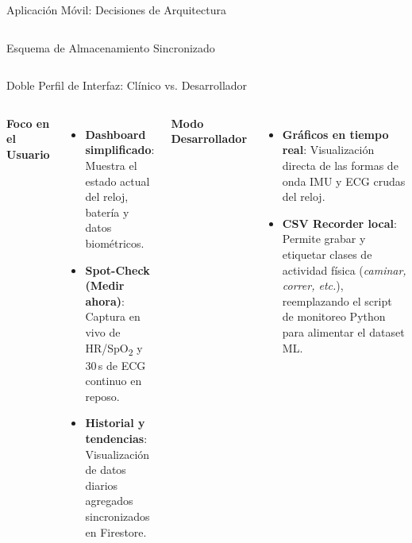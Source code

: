 \documentclass[aspectratio=169, 10pt]{beamer}
\begin{document}
\begin{frame}{Aplicaci\'on M\'ovil: Decisiones de Arquitectura}
\begin{columns}[T]
\begin{block}{Esquema de Almacenamiento Sincronizado}
        \end{block}
        \vspace{0.1cm}
    \end{columns}
\end{frame}

\begin{frame}{Doble Perfil de Interfaz: Cl\'inico vs. Desarrollador}
    \begin{columns}[T]
        \footnotesize
        \textbf{Foco en el Usuario}
        \begin{itemize}\itemsep0.1cm
            \item \textbf{Dashboard simplificado}: Muestra el estado actual del reloj, bater\'ia y datos biom\'etricos.
            \item \textbf{Spot-Check (Medir ahora)}: Captura en vivo de HR/SpO\textsubscript{2} y 30\,s de ECG continuo en reposo.
            \item \textbf{Historial y tendencias}: Visualizaci\'on de datos diarios agregados sincronizados en Firestore.
        \end{itemize}
        \footnotesize
        \textbf{Modo Desarrollador}
        \begin{itemize}\itemsep0.1cm
            \item \textbf{Gráficos en tiempo real}: Visualizaci\'on directa de las formas de onda IMU y ECG crudas del reloj.
            \item \textbf{CSV Recorder local}: Permite grabar y etiquetar clases de actividad f\'isica (\textit{caminar, correr, etc.}), reemplazando el script de monitoreo Python para alimentar el dataset ML.
        \end{itemize}
        \vspace{0.25cm}
    \end{columns}
\end{frame}
\end{document}
